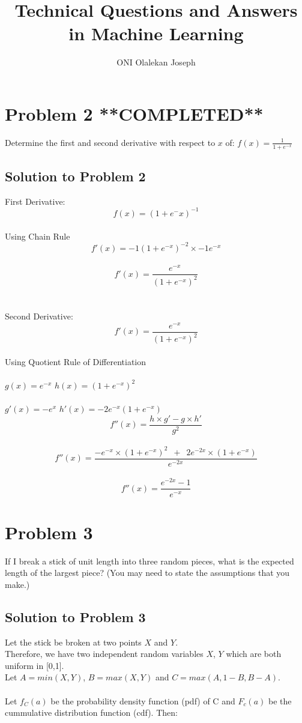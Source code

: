 \documentclass{article}
\begin{document}
\title{Technical Questions and Answers in Machine Learning}
\author{ONI Olalekan Joseph}

\maketitle

\section{Problem 2 **COMPLETED**}
Determine the first and second derivative with respect to $x$ of: $f(x)= \frac{1}{1 + e^{-x}} $

\subsection{Solution to Problem 2 }
 First Derivative: \\
 $$f(x) = (1 + e^-x)^{-1}$$ \\
 Using Chain Rule \\
 $$f'(x) = -1(1 + e^{-x})^{-2} \times -1e^{-x}$$ \\
 $$f'(x) = \frac{e^{-x}}{(1 + e^{-x})^{2}}$$ \\ \\
 
\noindent Second Derivative:  \\
 $$f'(x) = \frac{e^{-x}}{(1 + e^{-x})^{2}}$$ \\
 Using Quotient Rule of Differentiation \\ \\
 $g(x) = e^{-x}$  \qquad  $h(x) = (1 + e^{-x})^{2} $ \\\\
 $ g'(x) = -e^{x} $ \qquad $h'(x) = -2e^{-x}(1 + e^{-x}) $ \\
 $$f''(x) = \frac{h \times g' - g \times h' }{g^2} $$ \\
 $$f''(x) = \frac{-e^{-x} \times (1 + e^{-x})^{2} \enspace + \enspace 2e^{-2x} \times (1 + e^{-x})}{e^{-2x}} $$\\
 $$f''(x) = \frac{e^{-2x} - 1}{e^{-x}} $$
 
\section{Problem 3}
 If I break a stick of unit length into three random pieces, what is the expected length of the largest piece? (You may need to state the assumptions that you make.)
 
\subsection{Solution to Problem 3}
Let the stick be broken at two points $X$ and $Y$. \\
Therefore, we have two independent random variables $X$, $Y$ which are both uniform in [0,1]. \\
Let $A=min(X,Y)$, $B=max(X,Y)$ and $C=max(A,1-B,B-A)$. \\ \\
Let $f_{C}(a)$ be the probability density function (pdf) of C and $ F_{c}(a)$ be the cummulative distribution function (cdf). Then: 
\end{document}

